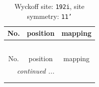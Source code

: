 \documentclass[fleqn,8pt]{jsarticle}
\begin{document}
\renewcommand{\arraystretch}{1.2}
\begin{longtable}{ccc}
\caption{Wyckoff site: {\tt 192i}, site symmetry: {\tt 11'}}
 \\
 \hline \hline
No. & position & mapping \\ \hline \endfirsthead

\multicolumn{2}{l}{\tablename\ \thetable{}} \\
 \hline \hline
No. & position & mapping \\ \hline \endhead

 \hline \hline
\multicolumn{2}{r}{\footnotesize\it continued ...} \\ \endfoot

 \hline \hline
\multicolumn{2}{r}{} \\ \endlastfoot


\end{longtable}
\end{document}
